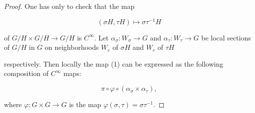 \begin{proof}
One has only to check that the map

\begin{equation}
\tag{1}\label{eq:3.64:1}
(\sigma H,\tau H)\mapsto\sigma\tau^{-1}H
\end{equation}

of $G/H \times G/H \to G/H$ is $C^{\infty}$. Let $\alpha_{\sigma}: W_{\sigma} \to G$ and $\alpha_{\tau}: W_{\tau} \to G$ be local sections of $G/H$ in $G$ on neighborhoods $W_{e}$ of $\sigma H$ and $W_{r}$ of $\tau H$

respectively. Then locally the map (1) can be expressed as the following composition of $C^{\infty}$ maps:

\begin{equation}
\tag{2}\label{eq:3.64:2}
\pi\circ\varphi\circ(\alpha_{\sigma}\times\alpha_{\tau}),
\end{equation}

where  $ \varphi: G \times G \to G $ is the map  $ \varphi(\sigma, \tau) = \sigma\tau^{-1} $.

\end{proof}

